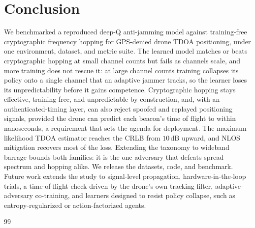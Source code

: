 \documentclass[journal]{IEEEtran}
\begin{document}
\section{Conclusion}\label{sec:conclusion}
We benchmarked a reproduced deep-Q anti-jamming model against training-free
cryptographic frequency hopping for GPS-denied drone TDOA positioning, under one
environment, dataset, and metric suite. The learned model matches or beats
cryptographic hopping at small channel counts but fails as channels scale, and
more training does not rescue it: at large channel counts training collapses
its policy onto a single channel that an adaptive jammer tracks, so the learner
loses its unpredictability before it gains competence. Cryptographic hopping
stays effective, training-free, and unpredictable by construction, and,
with an authenticated-timing layer, can also reject spoofed and replayed
positioning signals, provided the drone can predict each beacon's time of flight
to within nanoseconds, a requirement that sets the agenda for deployment. The
maximum-likelihood TDOA estimator reaches the CRLB from $10$\,dB upward, and
NLOS mitigation recovers most of the loss.
Extending the taxonomy to wideband barrage bounds both families: it is the one
adversary that defeats spread spectrum and hopping alike. We release the
datasets, code, and benchmark. Future work extends the study to signal-level
propagation, hardware-in-the-loop trials, a time-of-flight check driven by
the drone's own tracking filter, adaptive-adversary co-training, and
learners designed to resist policy collapse, such as entropy-regularized or
action-factorized agents.

\begin{thebibliography}{99}

\end{thebibliography}
\end{document}
